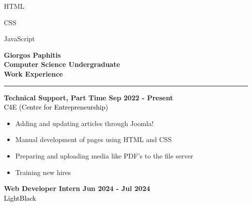 \documentclass[12pt]{article}
\begin{document}
\begin{paracol}{2}
\begin{tcolorbox}[colback=bgcolor, colframe=bgcolor, boxrule=0cm, arc=0cm, outer arc=0cm, left=0.35cm, right=0.10cm, top=1cm, bottom=1.5cm,height=\textheight]
{\begin{itemize}[leftmargin=15pt, itemsep=0pt, topsep=0pt]
\begin{multicols}{2}
            \item HTML\\
            \item CSS\\
            \item JavaScript\\
         \end{multicols}
      \end{itemize}
      }
   \end{tcolorbox}
   \switchcolumn
      \vspace*{1.7cm}
      \textbf{\Huge \textcolor{bgcolor}{Giorgos Paphitis}}\\[0.5em]
      \textbf{Computer Science Undergraduate}\\
      \vspace{1.5cm}
      {\fontsize{14pt}{13pt}\selectfont
      \textbf{\textcolor{bgcolor}{Work Experience}}\\[0.3em]
      }
      \hrule
      \vspace{0.5cm}
      \textbf{\textcolor{bgcolor}{Technical Support, Part Time \hfill Sep 2022 - Present}}\\[0.5em]
      \textcolor{black}{C4E (Centre for Entrepreneurship)}\\[0.5em]
      {\renewcommand{\labelitemi}{\textcolor{bgcolor}{\normalsize$\bullet$}}%
      \begin{itemize}[leftmargin=33pt, itemsep=0pt, topsep=0pt]
            \item Adding and updating articles through Joomla!\\
            \item Manual development of pages using HTML and CSS\\
            \item Preparing and uploading media like PDF's to the file server\\
            \item Training new hires\\
         \end{itemize}
      }
      \vspace{0.5cm}
      \textbf{\textcolor{bgcolor}{Web Developer Intern \hfill Jun 2024 - Jul 2024}}\\[0.5em]
      \textcolor{black}{LightBlack}\\[0.5em]
      {\renewcommand{\labelitemi}{\textcolor{bgcolor}{\normalsize$\bullet$}}%
      \begin{itemize}[leftmargin=33pt, itemsep=0pt, topsep=0pt]

\end{itemize}}
\end{paracol}
\end{document}
